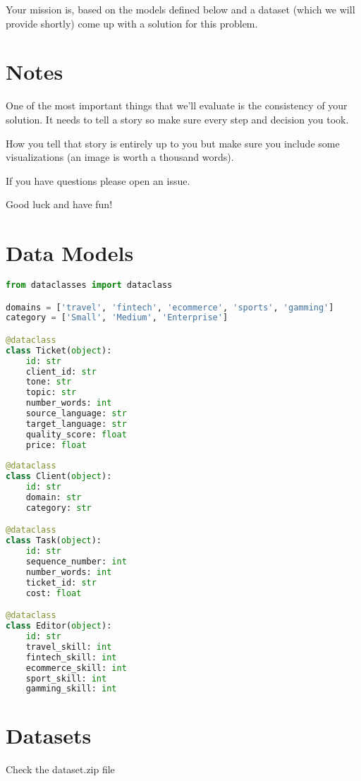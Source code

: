\documentclass[]{extarticle}
\begin{document}
Your mission is, based on the models defined below and a dataset  (which we will provide shortly) come up with a solution for this problem.

\section{Notes}

One of the most important things that we'll evaluate is the consistency of your solution. It needs to tell a story so make sure every step and decision you took.

How you tell that story is entirely up to you but make sure you include some visualizations (an image is worth a thousand words).

If you have questions please open an issue.

Good luck and have fun!

\section{Data Models}

\begin{lstlisting}[language=Python]
from dataclasses import dataclass

domains = ['travel', 'fintech', 'ecommerce', 'sports', 'gamming']
category = ['Small', 'Medium', 'Enterprise']

@dataclass
class Ticket(object):
    id: str
    client_id: str
    tone: str
    topic: str
    number_words: int
    source_language: str
    target_language: str
    quality_score: float
    price: float
    
@dataclass
class Client(object):
    id: str
    domain: str
    category: str

@dataclass
class Task(object):
    id: str
    sequence_number: int
    number_words: int
    ticket_id: str
    cost: float

@dataclass
class Editor(object):
    id: str
    travel_skill: int
    fintech_skill: int
    ecommerce_skill: int
    sport_skill: int
    gamming_skill: int
\end{lstlisting}


\section{Datasets}

Check the dataset.zip file
\end{document}
